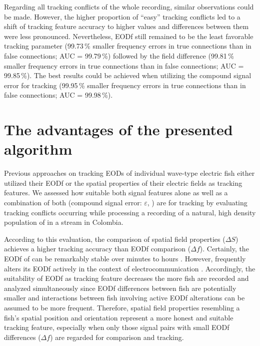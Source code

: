 Regarding all tracking conflicts of the whole recording, similar observations could be made. However, the higher proportion of ``easy'' tracking conflicts led to a shift of tracking feature accuracy to higher values and differences between them were less pronounced. Nevertheless, EODf still remained to be the least favorable tracking parameter (99.73\,\% smaller frequency errors in true connections than in false connections; AUC = 99.79\,\%) followed by the field difference (99.81\,\% smaller frequency errors in true connections than in false connections; AUC = 99.85\,\%). The best results could be achieved when utilizing the compound signal error for tracking (99.95\,\% smaller frequency errors in true connections than in false connections; AUC = 99.98\,\%).


\section{The advantages of the presented algorithm}

Previous approaches on tracking EODs of individual wave-type electric fish either utilized their EODf \citep{Henninger2020} or the spatial properties of their electric fields \citep{Madhav2018} as tracking features. We assessed how suitable both signal features alone  as well as a combination of both (compound signal error: $\varepsilon$, ) are for tracking by evaluating tracking conflicts occurring while processing a recording of a natural, high density population of \lepto{} in a stream in Colombia. 

According to this evaluation, the comparison of spatial field properties ($\Delta S$) achieves a higher tracking accuracy than EODf comparison ($\Delta f$). Certainly, the EODf of \lepto{} can be remarkably stable over minutes to hours \citep{Moortgat1998}. However, \lepto{} frequently alters its EODf actively in the context of electrocommunication \citep{Smith2013}. Accordingly, the suitability of EODf as tracking feature decreases the more fish are recorded and analyzed simultaneously since EODf differences between fish are potentially smaller and interactions between fish involving active EODf alterations can be assumed to be more frequent. Therefore, spatial field properties resembling a fish's spatial position and orientation represent a more honest and suitable tracking feature, especially when only those signal pairs with small EODf differences ($\Delta f$) are regarded for comparison and tracking.

